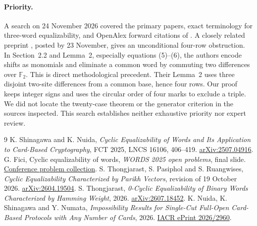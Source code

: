 \documentclass[11pt]{article}
\begin{document}
\paragraph{Priority.}
A search on 24 November 2026 covered the primary papers, exact terminology for three-word equalizability, and OpenAlex forward citations of \cite{sn,tpr,t}. A closely related preprint \cite{nsn}, posted by 23 November, gives an unconditional four-row obstruction. In Section~2.2 and Lemma~2, especially equations (5)--(6), the authors encode shifts as monomials and eliminate a common word by commuting two differences over $\mathbb F_2$. This is direct methodological precedent. Their Lemma~2 uses three disjoint two-site differences from a common base, hence four rows. Our proof keeps integer signs and uses the circular order of four marks to exclude a triple. We did not locate the twenty-case theorem or the generator criterion in the sources inspected. This search establishes neither exhaustive priority nor expert review.

\begin{thebibliography}{9}
 K. Shinagawa and K. Nuida, \emph{Cyclic Equalizability of Words and Its Application to Card-Based Cryptography}, FCT 2025, LNCS 16106, 406--419. \href{https://arxiv.org/abs/2507.04916}{arXiv:2507.04916}.
 G. Fici, Cyclic equalizability of words, \emph{WORDS 2025 open problems}, final slide. \href{https://words2025.loria.fr/files/2025/07/webpage-open-problems.pdf}{Conference problem collection}.
 S. Thongjarast, S. Pasiphol and S. Ruangwises, \emph{Cyclic Equalizability Characterized by Parikh Vectors}, revision of 19 October 2026. \href{https://arxiv.org/abs/2604.19504}{arXiv:2604.19504}.
 S. Thongjarast, \emph{0-Cyclic Equalizability of Binary Words Characterized by Hamming Weight}, 2026. \href{https://arxiv.org/abs/2607.18452}{arXiv:2607.18452}.
 K. Nuida, K. Shinagawa and Y. Numata, \emph{Impossibility Results for Single-Cut Full-Open Card-Based Protocols with Any Number of Cards}, 2026. \href{https://eprint.iacr.org/2026/2960}{IACR ePrint 2026/2960}.
\end{thebibliography}
\end{document}
